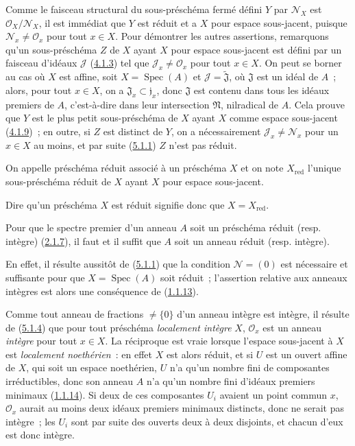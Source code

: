 Comme le faisceau structural du sous-préschéma fermé défini $Y$ par
$\mathscr{N}_X$ est $\mathscr{O}_X/\mathscr{N}_X$, il est immédiat que $Y$
est réduit et a $X$ pour espace sous-jacent, puisque
$\mathscr{N}_x\ne\mathscr{O}_x$ pour tout $x\in X$. Pour démontrer les autres
assertions, remarquons qu'un sous-préschéma $Z$ de $X$ ayant $X$ pour espace
sous-jacent est défini par un faisceau d'idéaux $\mathscr{J}$
(\hyperref[I.4.1.3-fr]{4.1.3}) tel que
$\mathscr{J}_x\ne\mathscr{O}_x$ pour tout $x\in X$. On peut se borner au cas
où $X$ est affine, soit $X=\operatorname{Spec}(A)$ et
$\mathscr{J}=\widetilde{\mathfrak{J}}$, où $\mathfrak{J}$ est un idéal de
$A$~; alors, pour tout $x\in X$, on a
$\mathfrak{J}_x\subset\mathfrak{j}_x$, donc $\mathfrak{J}$ est contenu dans
tous les idéaux premiers de $A$, c'est-à-dire dans leur intersection
$\mathfrak{N}$, nilradical de $A$. Cela prouve que $Y$ est le plus petit
sous-préschéma de $X$ ayant $X$ comme espace sous-jacent
(\hyperref[I.4.1.9-fr]{4.1.9})~; en outre, si $Z$ est distinct de $Y$, on a
nécessairement $\mathscr{J}_x\ne\mathscr{N}_x$ pour un $x\in X$ au moins, et
par suite (\hyperref[I.5.1.1-fr]{5.1.1}) $Z$ n'est pas réduit.

\begin{definition}[5.1.3]
\label{I.5.1.3-fr}
On appelle préschéma réduit associé à un préschéma $X$ et on note
$X_{\mathrm{red}}$ l'unique sous-préschéma réduit de $X$ ayant $X$ pour
espace sous-jacent.
\end{definition}

Dire qu'un préschéma $X$ est réduit signifie donc que
$X=X_{\mathrm{red}}$.

\begin{proposition}[5.1.4]
\label{I.5.1.4-fr}
Pour que le spectre premier d'un anneau $A$ soit un préschéma réduit (\textup{resp.}
intègre) (\hyperref[I.2.1.7-fr]{2.1.7}), il faut et il suffit que $A$ soit un
anneau réduit (\textup{resp.} intègre).
\end{proposition}

En effet, il résulte aussitôt de (\hyperref[I.5.1.1-fr]{5.1.1}) que la
condition $\mathscr{N}=(0)$ est nécessaire et suffisante pour que
$X=\operatorname{Spec}(A)$ soit réduit~; l'assertion relative aux anneaux
intègres est alors une conséquence de
(\hyperref[I.1.1.13-fr]{1.1.13}).

Comme tout anneau de fractions $\ne\{0\}$ d'un anneau intègre est intègre, il
résulte de (\hyperref[I.5.1.4-fr]{5.1.4}) que pour tout préschéma
\emph{localement intègre} $X$, $\mathscr{O}_x$ est un anneau \emph{intègre}
pour tout $x\in X$. La réciproque est vraie lorsque l'espace sous-jacent à
$X$ est \emph{localement noethérien}~: en effet $X$ est alors réduit, et si
$U$ est un ouvert affine de $X$, qui soit un espace noethérien, $U$ n'a qu'un
nombre fini de composantes irréductibles, donc son anneau $A$ n'a qu'un
nombre fini d'idéaux premiers minimaux
(\hyperref[I.1.1.14-fr]{1.1.14}). Si deux de ces composantes $U_i$ avaient un
point commun $x$, $\mathscr{O}_x$ aurait au moins deux idéaux premiers
minimaux distincts, donc ne serait pas intègre~; les $U_i$ sont par suite des
ouverts deux à deux disjoints, et chacun d'eux est donc intègre.

